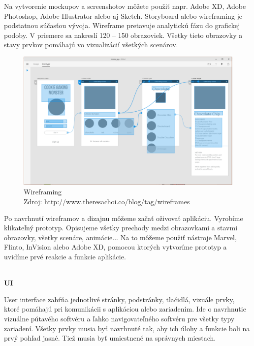 \documentclass[10pt,twoside,slovak,a4paper]{article}
\begin{document}
Na vytvorenie mockupov a screenshotov môžete použiť napr. Adobe XD, Adobe Photoshop, Adobe Illustrator alebo aj Sketch. Storyboard alebo wireframing je podstatnou súčasťou vývoja. Wireframe pretavuje analytickú fázu do grafickej podoby. V priemere sa nakreslí 120 – 150 obrazoviek. Všetky tieto obrazovky a stavy prvkov pomáhajú vo vizualizácií všetkých scenárov.

\begin{figure}[h!]
\includegraphics[scale=0.23]{wireframing1}
\centering
\caption{Wireframing
\\ Zdroj: \url{http://www.theresachoi.co/blog/tag/wireframes}}
\end{figure}

\newpage           %

Po navrhnutí wireframov a dizajnu môžeme začať oživovať aplikáciu. Vyrobíme klikateľný prototyp. Opisujeme všetky prechody medzi obrazovkami a stavmi obrazovky, všetky scenáre, animácie... Na to môžeme použiť nástroje Marvel, Flinto, InVision alebo Adobe XD, pomocou ktorých vytvoríme prototyp a uvidíme prvé reakcie a funkcie aplikácie.

\cite{EMM1, winpc}
\\	%


\textbf{UI}

\quad User interface zahŕňa jednotlivé stránky, podstránky, tlačidlá, vizuále prvky, ktoré pomáhajú pri komunikácii s aplikáciou alebo zariadením. Ide o navrhnutie vizuálne pútavého softvéru a ľahko navigovateľného softvéru pre všetky typy zariadení. Všetky prvky musia byť navrhnuté tak, aby ich úlohy a funkcie boli na prvý pohľad jasné. Tiež musia byť umiestnené na správnych miestach.
\cite{touch4it}
\\	%
\end{document}
